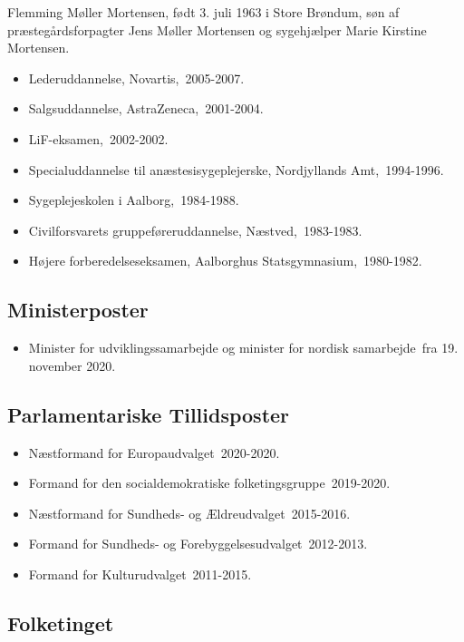 \documentclass[11pt, a4paper]{awesome-cv}
\begin{document}
\makecvheader[R]
\makelettertitle
\begin{cvletter}
Flemming Møller Mortensen, født 3. juli 1963 i Store Brøndum, søn af præstegårdsforpagter Jens Møller Mortensen og sygehjælper Marie Kirstine Mortensen.

\begin{itemize}
\item Lederuddannelse, Novartis, 2005-2007.
\item Salgsuddannelse, AstraZeneca, 2001-2004.
\item LiF-eksamen, 2002-2002.
\item Specialuddannelse til anæstesisygeplejerske, Nordjyllands Amt, 1994-1996.
\item Sygeplejeskolen i Aalborg, 1984-1988.
\item Civilforsvarets gruppeføreruddannelse, Næstved, 1983-1983.
\item Højere forberedelseseksamen, Aalborghus Statsgymnasium, 1980-1982.
\end{itemize}
\subsection*{Ministerposter}
\begin{itemize}
\item Minister for udviklingssamarbejde og minister for nordisk samarbejde fra 19. november 2020.
\end{itemize}
\subsection*{Parlamentariske Tillidsposter}
\begin{itemize}
\item Næstformand for Europaudvalget 2020-2020.
\item Formand for den socialdemokratiske folketingsgruppe 2019-2020.
\item Næstformand for Sundheds- og Ældreudvalget 2015-2016.
\item Formand for Sundheds- og Forebyggelsesudvalget 2012-2013.
\item Formand for Kulturudvalget 2011-2015.
\end{itemize}
\subsection*{Folketinget}

\end{cvletter}
\end{document}
